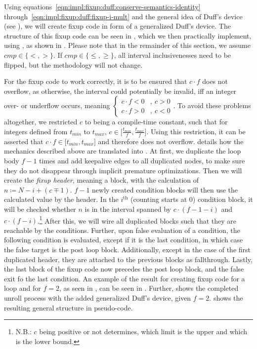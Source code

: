 Using equations~\ref{eqn:impl:fixup:duff:conserve-semantics-identity} through~\ref{eqn:impl:fixup:duff:fixup-i-mult} and the general idea of Duff's device (see ), we will create fixup code in form of a generalized Duff's device.
The structure of this fixup code can be seen in , which we then practically implement, using , as shown in .
Please note that in the remainder of this section, we assume $cmp \in \{<, >\}$.
If $cmp \in \{ \leq, \geq \}$, all interval inclusivenesses need to be flipped, but the methodology will not change.





For the fixup code to work correctly, it is to be ensured that $c \cdot f$ does not overflow, as otherwise, the interval \cinterval could potentially be invalid, iff an integer over- or underflow occurs, meaning $
\begin{cases}
    c \cdot f < 0 &, \medspace c > 0\\
    c \cdot f > 0 &, \medspace c < 0
\end{cases}$.
To avoid these problems altogether, we restricted $c$ to being a compile-time constant, such that for integers defined from $t_{min}$ to $t_{max}$, $c \in \lbrack \frac{t_{min}}{f}, \frac{t_{max}}{f} \rbrack$.
Using this restriction, it can be asserted that $c \cdot f \in \lbrack t_{min}, t_{max} \rbrack$ and therefore does not overflow.
 details how the mechanics described above are translated into \libFIRM.
At first, we duplicate the loop body $f - 1$ times and add keepalive edges to all duplicated nodes, to make sure they do not disappear through implicit premature optimizations.
Then we will create the \textit{fixup header}, meaning a block, with the calculation of $n \coloneqq N - i + (c \mp 1)$.
$f - 1$ newly created condition blocks will then use the calculated value by the header.
In the $i^{\text{th}}$ (counting starts at 0) condition block, it will be checked whether $n$ is in the interval spanned by $c \cdot (f - 1 - i)$ and  $c \cdot (f - i)$.\footnote{N.B.: $c$ being positive or not determines, which limit is the upper and which is the lower bound.}
After this, we will wire all duplicated blocks such that they are reachable by the conditions.
Further, upon false evaluation of a condition, the following condition is evaluated, except if it is the last condition, in which case the false target is the post loop block.
Additionally, except in the case of the first duplicated header, they are attached to the previous blocks as fallthrough.
Lastly, the last block of the fixup code now precedes the post loop block, and the false exit fo the last condition.
An example of the result for creating fixup code for a loop and for $f = 2$, as seen in , can be seen in .
Further,  shows the completed unroll process with the added generalized Duff's device, given $f = 2$.
 shows the resulting general structure in pseudo-code.

